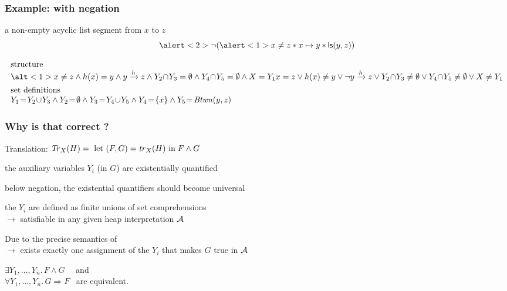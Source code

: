 \documentclass{beamer}
\begin{document}
\begin{frame}
  \frametitle{Example: with negation}
a non-empty acyclic list segment from $x$ to $z$
\[ \alert<2>{\neg} ( \alert<1>{x \neq z* x \mapsto y * \liste{y}{z}} ) \]

\[
\begin{array}{l}
\text{structure}\\
\alt<1>{
x \neq z \land \edge(x)=y \land \reach{y}{z} \land
Y_2\!\cap\!Y_3 = \emptyset \land
Y_4\!\cap\!Y_5 = \emptyset \land
X = Y_1
}{
x = z \lor \edge(x) \neq y \lor \neg\reach{y}{z} \lor
Y_2\!\cap\!Y_3 \neq \emptyset \lor
Y_4\!\cap\!Y_5 \neq \emptyset \lor
X \neq Y_1
}\\[1ex]

\text{set definitions}\\
Y_1\!=\!Y_2\!\cup\!Y_3 \land
Y_2\!=\!\emptyset \land
Y_3\!=\!Y_4\!\cup\!Y_5 \land %
Y_4\!=\!\{x\} \land
Y_5\!=\!\Btwn(y,z)
\end{array}
\]
\end{frame}

\begin{frame}
  \frametitle{Why is that correct ?}
    
Translation: $\trfull{H}{X} = \ \letin{(F,G)}{\tr_X(H)} \; F \land G$

\vspace{1ex}

the auxiliary variables $Y_i$ (in $G$) are existentially quantified

\vspace{1ex}

below negation, the existential quantifiers should become universal

\pause{}
\vspace{1ex}

the $Y_i$ are defined as finite unions of set comprehensions\\
$\rightarrow$ satisfiable in any given heap interpretation $\alg$

\pause{}
\vspace{1ex}

Due to the precise semantics of \JoshLogic\\
$\rightarrow$ \alert{exists exactly one assignment of the $Y_i$} that makes $G$ true in $\alg$

\pause{}
\vspace{1ex}

$\exists Y_1,\dots,Y_n.\, F \land G$ \ \  and\\
$\forall Y_1,\dots,Y_n.\, G \Rightarrow F$ \ are equivalent. 

\end{frame}
\end{document}
